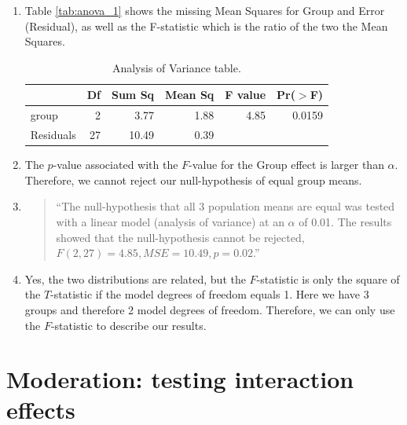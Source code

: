\documentclass[]{report}\usepackage[]{graphicx}\usepackage[]{color}
\begin{document}
\begin{enumerate}

\item 

Table \ref{tab:anova_1} shows the missing Mean Squares for Group and Error (Residual), as well as the F-statistic which is the ratio of the two the Mean Squares. 

\begin{table}[ht]
\centering
\caption{Analysis of Variance table.} 
\label{tab:anova_2}
\begin{tabular}{lrrrrr}
  \hline
 & Df & Sum Sq & Mean Sq & F value & Pr($>$F) \\ 
  \hline
group & 2 & 3.77 & 1.88 & 4.85 & 0.0159 \\ 
  Residuals & 27 & 10.49 & 0.39 &  &  \\ 
   \hline
\end{tabular}
\end{table}


\item The $p$-value associated with the $F$-value for the Group effect is larger than $\alpha$. Therefore, we cannot reject our null-hypothesis of equal group means. 


\item 

\begin{quote}
``The null-hypothesis that all 3 population means are equal was tested with a linear model (analysis of variance) at an $\alpha$ of 0.01. The results showed that the null-hypothesis cannot be rejected, $F(2, 27) = 4.85, MSE = 10.49 , p = 0.02$.''
\end{quote}


\item Yes, the two distributions are related, but the $F$-statistic is only the square of the $T$-statistic if the model degrees of freedom equals 1. Here we have 3 groups and therefore 2 model degrees of freedom. Therefore, we can only use the $F$-statistic to describe our results.



\end{enumerate}






\chapter{Moderation: testing interaction effects}\label{chap:moderation}
\end{document}
